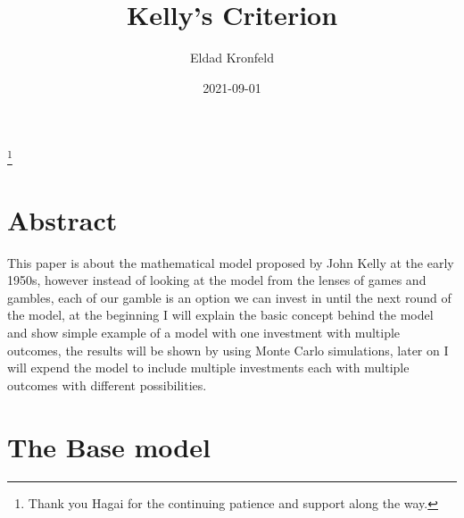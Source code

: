 \documentclass{article}
\title{Kelly's Criterion}
\date{2021-09-01}
\author{Eldad Kronfeld}
\begin{document}
	\maketitle
	\thanks{Thank you Hagai for the continuing patience and support along the way.}
	\tableofcontents
	\newpage
	\section{Abstract}
		This paper is about the mathematical model proposed by John Kelly \cite{Finance} at the early 1950s, 
		however instead of looking at the model from the lenses of games and gambles, each of our gamble is an option we can invest in until the next round of the model, at the beginning I will explain the basic concept behind the model and show simple example of a model with one investment with multiple outcomes, the results will be shown by using Monte Carlo simulations, later on I will expend the model to include multiple investments each with multiple outcomes with different possibilities.
	\section{The Base model}
\end{document}
